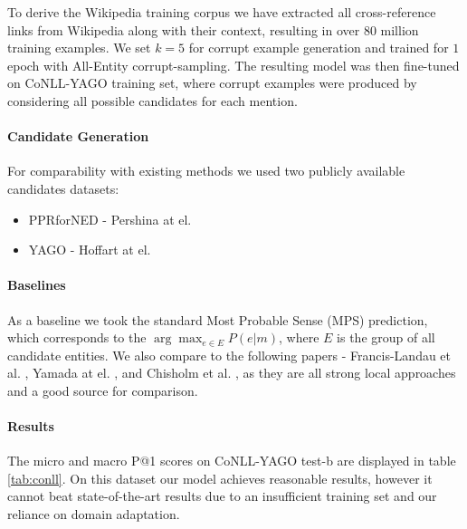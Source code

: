 \documentclass[11pt]{article}
\begin{document}
	To derive the Wikipedia training corpus we have extracted all cross-reference links from Wikipedia along with their context, resulting in over $80$ million training examples. We set $k=5$ for corrupt example generation and trained for $1$ epoch with All-Entity corrupt-sampling. The resulting model was then fine-tuned on CoNLL-YAGO training set, where corrupt examples were produced by considering all possible candidates for each mention.
	
	\paragraph{Candidate Generation}
	For comparability with existing methods we used two publicly available candidates datasets:
	\begin{itemize}
		\item PPRforNED - Pershina at el. 
		\item YAGO - Hoffart at el. 
	\end{itemize}
	
	\paragraph{Baselines}
	As a baseline we took the standard Most Probable Sense (MPS) prediction, which corresponds to the $\arg\max_{e\in{{E}}}{P(e|m)}$, where $E$ is the group of all candidate entities.
	We also compare to the following papers - Francis-Landau et al. ,  Yamada at el. , and Chisholm et al. , as they are all strong local approaches and a good source for comparison.
	
	
	\paragraph{Results}
	The micro and macro P@1 scores on CoNLL-YAGO test-b are displayed in table \ref{tab:conll}. On this dataset our model achieves reasonable results, however it cannot beat state-of-the-art results due to an insufficient training set and our reliance on domain adaptation.
	
\end{document}
